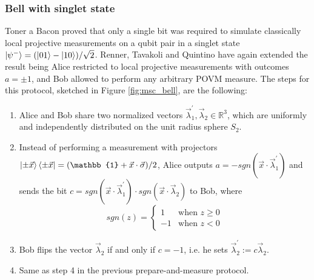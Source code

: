 \subsubsection{Bell with singlet state}\label{section:protocol_bell}
Toner a Bacon \cite{toner2003} proved that only a single bit was required to simulate classically local projective measurements on a qubit pair in a singlet state $\ket{\psi^{-}}=(\ket{01} - \ket{10})/\sqrt{2}$. Renner, Tavakoli and Quintino \cite{renner2023} have again extended the result being Alice restricted to local projective measurements with outcomes $a=\pm 1$, and Bob allowed to perform any arbitrary POVM measure. The steps for this protocol, sketched in Figure \ref{fig:msc_bell}, are the following:
\begin{enumerate}
 \item Alice and Bob share two normalized vectors $\vec{\lambda}_1^{\prime}, \vec{\lambda}_2 \in \mathbb{R}^{3}$, which are uniformly and independently distributed on the unit radius sphere $S_2$.
 \item Instead of performing a measurement with projectors $\ket{\pm\vec{x}}\bra{\pm\vec{x}} = (\mathbb{1} + \vec{x} \cdot \vec{\sigma})/2$, Alice outputs $a = -sgn(\vec{x} \cdot \vec{\lambda}^{\prime}_1)$ and sends the bit $c = sgn(\vec{x} \cdot \vec{\lambda}^{\prime}_1) \cdot sgn(\vec{x} \cdot \vec{\lambda}_2)$ to Bob, where 
 \begin{equation}
sgn(z) =
    \begin{cases}
      1 & \text{when $z \ge 0$}\\
      -1 & \text{when $z<0$}
    \end{cases} 
\end{equation}
 \item Bob flips the vector $\vec{\lambda}_2$ if and only if $c=-1$, i.e. he sets $\vec{\lambda}^{\prime}_{2} := c \vec{\lambda}_{2}$.
 \item Same as step 4 in the previous prepare-and-measure protocol.
\end{enumerate}

